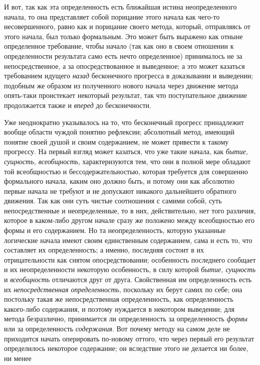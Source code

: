 И вот, так как эта определенность есть ближайшая истина
неопределенного начала, то она представляет собой порицание этого начала
как чего-то несовершенного, равно как и порицание своего метода, который,
отправляясь от этого начала, был только формальным. Это может быть выражено
как отныне определенное требование, чтобы начало (так как оно в своем
отношении к определенности результата само есть нечто определенное)
принималось не за непосредственное, а за опосредствованное и
выведенное; а это может казаться требованием идущего
{\em назад} бесконечного
прогресса в доказывании и выведении; подобным же образом из полученного
нового начала через движение метода опять-таки проистекает некоторый
результат, так что поступательное движение продолжается также и
{\em вперед} до бесконечности.

Уже неоднократно указывалось на то, что бесконечный прогресс
принадлежит вообще области чуждой понятию рефлексии; абсолютный метод,
имеющий понятие своей душой и своим содержанием, не может привести к такому
прогрессу. На первый взгляд может казаться, что уже такие начала, как
{\em бытие, сущность, всеобщность},
характеризуются тем, что они в полной мере обладают той
всеобщностью и бессодержательностью, которая требуется для совершенно
формального начала, каким оно должно быть, и потому они как абсолютно
первые начала не требуют и не допускают никакого дальнейшего обратного
движения. Так как они суть чистые соотношения с самими собой, суть
непосредственные и неопределенные, то в них, действительно, нет того
различия, которое в каком-либо другом начале сразу же положено между
всеобщностью его формы и его содержанием. Но та неопределенность, которую
указанные логические начала имеют своим единственным содержанием, сама и
есть то, что составляет их определенность; а именно, последняя состоит в их
отрицательности как снятом опосредствовании; особенность последнего
сообщает и их неопределенности некоторую особенность, в силу которой
{\em бытие, сущность} и {\em всеобщность}
отличаются друг от друга. Свойственная им определенность есть
их {\em непосредственная
определенность}, поскольку их берут самих по себе; она
постольку такая же непосредственная определенность, как определенность
какого-либо содержания, и поэтому нуждается в некотором выведении; для
метода безразлично, принимается ли определенность за определенность
{\em формы} или за определенность {\em содержания}.
Вот почему методу на самом деле не приходится начать
оперировать по-новому оттого, что через первый его результат определилось
некоторое содержание; он вследствие этого не делается ни более, ни менее
